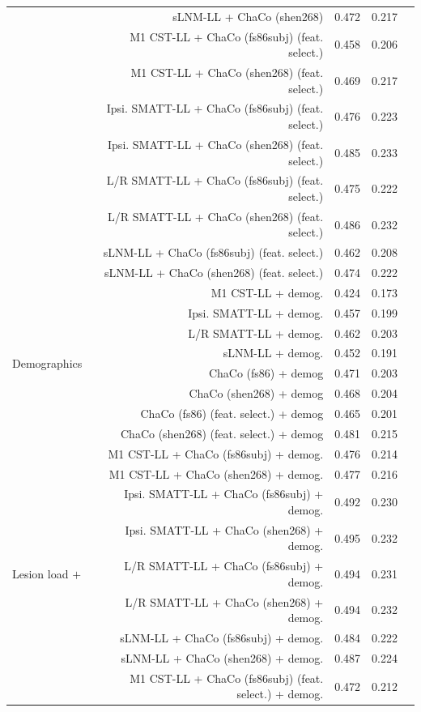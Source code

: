 \documentclass[phd,tocprelim]{cornell}
\def\Plus{\texttt{+}}
\begin{document}
\begin{table}[h]
\begin{scriptsize}
\begin{tabular}{lrrll}
 & sLNM-LL + ChaCo (shen268) & 0.472 & 0.217 \\
 & M1 CST-LL + ChaCo (fs86subj) (feat. select.) & 0.458 & 0.206 \\
 & M1 CST-LL + ChaCo (shen268) (feat. select.) & 0.469 & 0.217 \\
 & Ipsi. SMATT-LL + ChaCo (fs86subj) (feat. select.) & 0.476 & 0.223 \\
 & Ipsi. SMATT-LL + ChaCo (shen268) (feat. select.) & 0.485 & 0.233 \\
 & L/R SMATT-LL + ChaCo (fs86subj) (feat. select.) & 0.475 & 0.222 \\
 & L/R SMATT-LL + ChaCo (shen268) (feat. select.) & 0.486 & 0.232 \\
 & sLNM-LL + ChaCo (fs86subj) (feat. select.) & 0.462 & 0.208 \\
 & sLNM-LL + ChaCo (shen268) (feat. select.) & 0.474 & 0.222 \\
\multirow[t]{8}{*}{Demographics} & M1 CST-LL + demog. & 0.424 & 0.173 \\
 & Ipsi. SMATT-LL + demog. & 0.457 & 0.199 \\
 & L/R SMATT-LL + demog. & 0.462 & 0.203 \\
 & sLNM-LL + demog. & 0.452 & 0.191 \\
 & ChaCo (fs86) + demog & 0.471 & 0.203 \\
 & ChaCo (shen268) + demog & 0.468 & 0.204 \\
 & ChaCo (fs86) (feat. select.) + demog & 0.465 & 0.201 \\
 & ChaCo (shen268) (feat. select.) + demog & 0.481 & 0.215 \\
\multirow[t]{16}{*}{Lesion load $\Plus$} & M1 CST-LL + ChaCo (fs86subj) + demog. & 0.476 & 0.214 \\
 ChaCo $\Plus$ & M1 CST-LL + ChaCo (shen268) + demog. & 0.477 & 0.216 \\
 Demographics & Ipsi. SMATT-LL + ChaCo (fs86subj) + demog. & 0.492 & 0.230 \\
 & Ipsi. SMATT-LL + ChaCo (shen268) + demog. & 0.495 & 0.232 \\
 & L/R SMATT-LL + ChaCo (fs86subj) + demog. & 0.494 & 0.231 \\
 & L/R SMATT-LL + ChaCo (shen268) + demog. & 0.494 & 0.232 \\
 & sLNM-LL + ChaCo (fs86subj) + demog. & 0.484 & 0.222 \\
 & sLNM-LL + ChaCo (shen268) + demog. & 0.487 & 0.224 \\
 & M1 CST-LL + ChaCo (fs86subj) (feat. select.) + demog. & 0.472 & 0.212 \\

\end{tabular}
\end{scriptsize}
\end{table}
\end{document}
